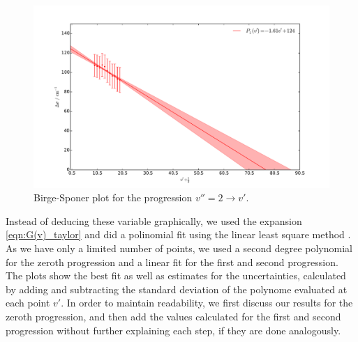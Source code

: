 \begin{figure}
    \centering
    \includegraphics[width=\pltw]{analysis/figures/b_s_2.pdf}
    \caption{Birge-Sponer plot for the progression $v'' = 2 \rightarrow v'$.  
    }
    \label{fig:b_s_2}
\end{figure}

Instead of deducing these variable graphically, we used the expansion 
\eqref{eqn:G(v)_taylor} and did a 
polinomial fit using the linear least square method \cite{cowan1998statistical}. 
As we have only a limited number of points, we used a second degree polynomial
for the zeroth progression and a linear fit for the first and second progression. 
The plots show the best fit as well as estimates for the uncertainties, 
calculated by adding and subtracting the standard deviation of the 
polynome evaluated at each point $v'$. 
In order to maintain readability, we first discuss our results for the zeroth 
progression, and then add the values calculated for the first and second progression 
without further explaining each step, if they are done analogously.

